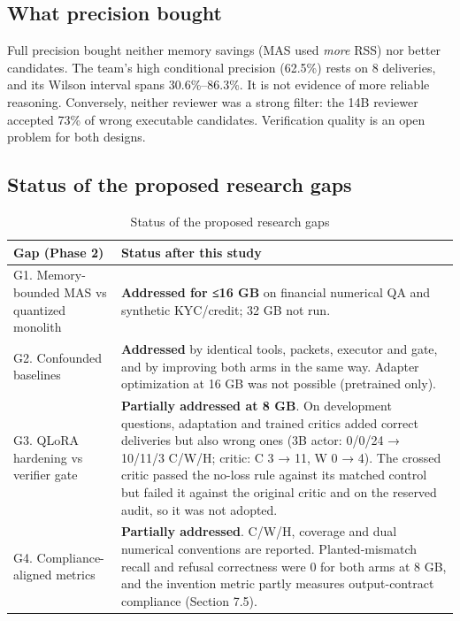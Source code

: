 \documentclass[letterpaper]{article}
\begin{document}
\subsection{What precision bought}\label{what-precision-bought}

Full precision bought neither memory savings (MAS used \emph{more} RSS) nor better candidates. The team's high conditional precision (62.5\%) rests on 8 deliveries, and its Wilson interval spans 30.6\%--86.3\%. It is not evidence of more reliable reasoning. Conversely, neither reviewer was a strong filter: the 14B reviewer accepted 73\% of wrong executable candidates. Verification quality is an open problem for both designs.

\subsection{Status of the proposed research gaps}\label{status-of-the-proposed-research-gaps}

\begin{table}[tbp]
\centering
\setlength{\tabcolsep}{3pt}
\begin{tabular}{@{}>{\raggedright\arraybackslash}p{225.74pt}>{\raggedright\arraybackslash}p{272.26pt}@{}}
\toprule
\textbf{Gap (Phase 2)} & \textbf{Status after this study} \\
\midrule
G1. Memory-bounded MAS vs quantized monolith & \textbf{Addressed for ≤16 GB} on financial numerical QA and synthetic KYC/credit; 32 GB not run. \\
G2. Confounded baselines & \textbf{Addressed} by identical tools, packets, executor and gate, and by improving both arms in the same way. Adapter optimization at 16 GB was not possible (pretrained only). \\
G3. QLoRA hardening vs verifier gate & \textbf{Partially addressed at 8 GB}. On development questions, adaptation and trained critics added correct deliveries but also wrong ones (3B actor: 0/0/24 → 10/11/3 C/W/H; critic: C 3 → 11, W 0 → 4). The crossed critic passed the no-loss rule against its matched control but failed it against the original critic and on the reserved audit, so it was not adopted. \\
G4. Compliance-aligned metrics & \textbf{Partially addressed}. C/W/H, coverage and dual numerical conventions are reported. Planted-mismatch recall and refusal correctness were 0 for both arms at 8 GB, and the invention metric partly measures output-contract compliance (Section 7.5). \\
\bottomrule
\end{tabular}
\caption{Status of the proposed research gaps}
\end{table}
\end{document}
